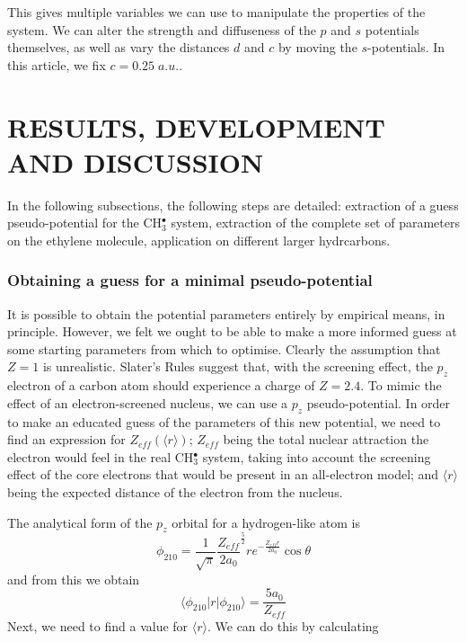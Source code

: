 \documentclass[12pt]{article}
\begin{document}
This gives multiple variables we can use to manipulate the properties of the system.
We can alter the strength and diffuseness of the \(p\) and \(s\) potentials themselves,
as well as vary the distances \(d\) and \(c\) by moving the \(s\)-potentials.
In this article, we fix \(c = 0.25\;a.u.\).

\section*{\sffamily \Large RESULTS, DEVELOPMENT AND DISCUSSION}

In the following subsections, the following steps are detailed: extraction of a guess pseudo-potential
for the CH$_3^\bullet$ system, extraction of the complete set of parameters on the ethylene molecule,
application on different larger hydrcarbons.

\subsubsection*{\sffamily \large Obtaining a guess for a minimal pseudo-potential} \label{minimalpotguess}

It is possible to obtain the potential parameters entirely by empirical means, in principle. However, we felt we ought to be able to make a more informed guess at some starting parameters from which to optimise. Clearly the assumption that \(Z = 1\) is unrealistic. Slater's Rules\cite{slatersrules} suggest that, with the screening effect, the \(p_{z}\) electron of a carbon atom should experience a charge of \(Z = 2.4\). To mimic the effect of an electron-screened nucleus, we can use a \(p_{z}\) pseudo-potential. In order to make an educated guess of the parameters of this new potential, we need to find an expression for \(Z_{eff}(\langle r \rangle)\); \(Z_{eff}\) being the total nuclear attraction the electron would feel in the real CH\(^{\bullet}_{3}\) system, taking into account the screening effect of the core electrons that would be present in an all-electron model; and \( \langle r \rangle \) being the expected distance of the electron from the nucleus.

The analytical form of the \(p_{z}\) orbital for a hydrogen-like atom is \cite{nyu_h_solutions}
\begin{equation}
\label{equation:analyticalpz}
\phi_{210} = \frac{1}{\sqrt{\pi}} \frac{Z_{eff}}{2a_{0}} ^{\frac{5}{2}} re^{-\frac{Z_{eff}r}{2a_{0}}} \cos \theta
\end{equation}
and from this we obtain 
\begin{equation}
\label{equation:PsirPsi}
\langle \phi_{210} | r | \phi_{210} \rangle = \frac{5a_{0}}{Z_{eff}}
\end{equation}
Next, we need to find a value for \( \langle r \rangle \). We can do this by calculating
\end{document}
